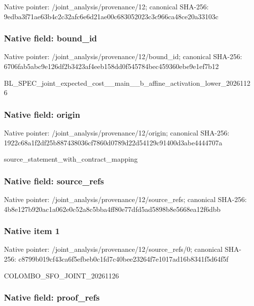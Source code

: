 \documentclass[10pt,a4paper]{article}
\begin{document}
Native pointer: /joint\_analysis/provenance/12; canonical SHA-256: 9edba3f71ae63b4c2c32afc6\allowbreak{}e6d21ae00c683052023c3c96\allowbreak{}6ca48ce20a33103c



\subsubsection{Native field: bound\_id}


Native pointer: /joint\_analysis/provenance/12/bound\_id; canonical SHA-256: 6706fab5abc9e126df2b3423\allowbreak{}af4eeb158dd0f545784bec45\allowbreak{}9360ebe9e1ef7b12


BL\_SPEC\_joint\_expected\_c\allowbreak{}ost\_\_main\_\_b\_affine\_acti\allowbreak{}vation\_lower\_20261126


\subsubsection{Native field: origin}


Native pointer: /joint\_analysis/provenance/12/origin; canonical SHA-256: 1922c68a1f2df25b88743803\allowbreak{}6cf7860d0789d22d54129c91\allowbreak{}400d3abe4444707a


source\_statement\_with\_contract\_mapping


\subsubsection{Native field: source\_refs}


Native pointer: /joint\_analysis/provenan\allowbreak{}ce/12/source\_refs; canonical SHA-256: 4b8e127b920ac1a062e0c52a\allowbreak{}8c5bba4ff80e77dfd5ad5898\allowbreak{}b8e5668ea12f6dbb



\subsubsection{Native item 1}


Native pointer: /joint\_analysis/provenan\allowbreak{}ce/12/source\_refs/0; canonical SHA-256: c8799b019cf43ca6f5efbeb0\allowbreak{}c1fd7c40bee23264f7e1017a\allowbreak{}d16b8341f5d64f5f


COLOMBO\_SFO\_JOINT\_20261126


\subsubsection{Native field: proof\_refs}
\end{document}
